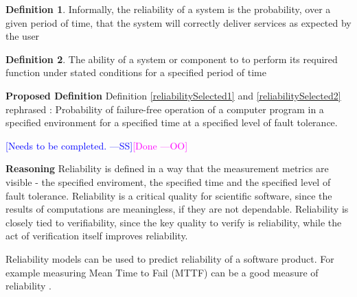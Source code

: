 \documentclass[letterpaper,cleveref]{lipics-v2019}
\newcommand{\authornote}[3]{\textcolor{#1}{[#3 ---#2]}}
\newcommand{\authornote}[3]{}
\newcommand{\wss}[1]{\authornote{blue}{SS}{#1}} %
\newcommand{\oo}[1]{\authornote{magenta}{OO}{#1}} %
\theoremstyle{definition}
\newtheorem{defn}{Definition}
\begin{document}
\begin{defn}
	Informally, the reliability of a system is the probability, over a given
	period of time, that the system will correctly deliver services as expected by
	the user \citep{sommerville}
\end{defn}
	
\begin{defn}
	The ability of a system or component to to perform its required function under stated conditions for a specified period of time \citep{IEEEComputerDictionary1991}
\end{defn}


\noindent \textbf{Proposed Definition}
Definition \ref{reliabilitySelected1} and \ref{reliabilitySelected2} rephrased : 	Probability of failure-free operation of a computer program in a specified environment for a specified time at a specified level of fault tolerance.

\wss{Needs to be completed.}\oo{Done}

\noindent \textbf{Reasoning}
Reliability is defined in a way that the measurement metrics are visible - the specified enviroment, the specified time and the specified level of fault tolerance. Reliability is a critical quality for scientific software, since the results of
computations are meaningless, if they are not dependable.  Reliability is
closely tied to verifiability, since the key quality to verify is reliability,
while the act of verification itself improves reliability.

Reliability models can be used to predict reliability of a software product. For
example measuring Mean Time to Fail (MTTF) can be a good measure of reliability
\citep{berander2005software}.
\end{document}
